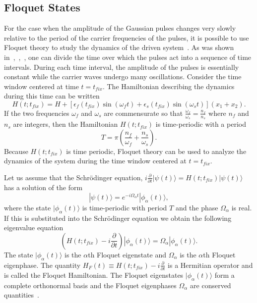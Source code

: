 \subsection{Floquet States}
\label{chapter-dblwell:section:qdynamics:subsec:floquet}
%
For the case when the amplitude of the Gaussian pulses changes very slowly relative to the period of the carrier frequencies of the pulses, it is possible to use Floquet theory to study the dynamics of the driven system~\cite{Floquet1883}. As was shown in~\cite{na-reichl:pbox},~\cite{na-reichl:mol-rot},~\cite{na-reichl:isomer}, one can divide the time over which the pulses act into a sequence of time intervals.  During each time interval, the amplitude of the pulses is essentially constant while the carrier waves undergo many oscillations.  Consider the time window centered at time $t=t_{fix}$.  The Hamiltonian describing the dynamics during this time can be written 
%
\begin{equation}
H(t;t_{fix})=H+\left[\epsilon_f(t_{fix})\sin(\omega_ft)+\epsilon_s(t_{fix})\sin(\omega_st)\right](x_1+x_2).
\end{equation}
%
If the two frequencies ${\omega}_f$ and ${\omega}_s$  are commensurate so that $\frac{\omega_f}{\omega_s}=\frac{n_f}{n_s}$ where $n_f$ and $n_s$ are integers, then the Hamiltonian $H(t;t_{fix})$  is time-periodic with a period 
%
\begin{equation}
T=\pi(\frac{n_f}{\omega_f}+\frac{n_s}{\omega_s}).
\label{eq:effperiod}
\end{equation}
%
Because $H(t;t_{fix})$ is time periodic, Floquet theory can be used to analyze the dynamics of the system during the time window centered at $t=t_{fix}$.

Let us assume that the Schr\"odinger equation, $i\frac{{\partial}}{{\partial}t}|\psi(t){\rangle}=H(t;t_{fix})|\psi(t){\rangle}$ has a solution of the form
%
\begin{equation}
|\psi(t)\rangle = e^{-i\Omega_{\alpha}t}|\phi_{\alpha}(t)\rangle ,
\end{equation}
%
where the state $|\phi_{\alpha}(t)\rangle$ is time-periodic with period $T$ and the phase $\Omega_{\alpha}$ is real.  If this is substituted into the Schr\"odinger equation we obtain the following eigenvalue equation
%
\begin{equation}
(H(t;t_{fix})-i\frac{\partial}{\partial t})|\phi_{\alpha}(t)\rangle = \Omega_{\alpha}|\phi_{\alpha}(t)\rangle.
\end{equation}
%
The state $|\phi_{\alpha}(t)\rangle$ is the $\alpha$th Floquet eigenstate and $\Omega_{\alpha}$ is the $\alpha$th Floquet eigenphase.  The quantity $H_F(t){\equiv}H(t;t_{fix})-i\frac{\partial}{\partial t}$ is a Hermitian operator and is called the Floquet Hamiltonian. The Floquet eigenstates $|\phi_{\alpha}(t)\rangle$  form a complete orthonormal basis and the Floquet eigenphases $\Omega_{\alpha}$ are conserved quantities~\cite{reichl}.

